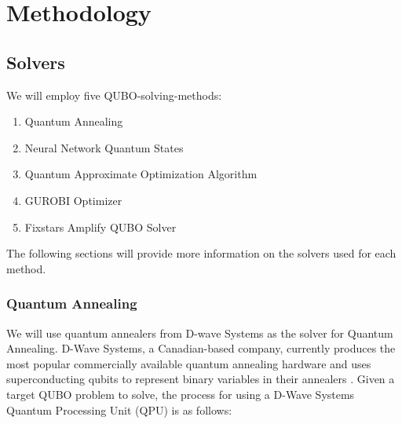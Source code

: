 
\chapter{Methodology}
\label{methodology}

\section{Solvers}
We will employ five QUBO-solving-methods:
\begin{enumerate}
    \item Quantum Annealing
    \item Neural Network Quantum States
    \item Quantum Approximate Optimization Algorithm
    \item GUROBI Optimizer
    \item Fixstars Amplify QUBO Solver
\end{enumerate}
The following sections will provide more information on the solvers used for each method.

\subsection{Quantum Annealing}
We will use quantum annealers from D-wave Systems as the solver for Quantum Annealing. D-Wave Systems, a Canadian-based company, currently produces the most popular commercially available quantum annealing hardware and uses superconducting qubits to represent binary variables in their annealers \cite{b14}.  Given a target QUBO problem to solve, the process for using a D-Wave Systems Quantum Processing Unit (QPU) is as follows:

